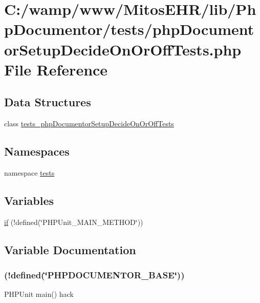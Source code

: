 \hypertarget{php_documentor_setup_decide_on_or_off_tests_8php}{\section{\-C\-:/wamp/www/\-Mitos\-E\-H\-R/lib/\-Php\-Documentor/tests/php\-Documentor\-Setup\-Decide\-On\-Or\-Off\-Tests.php \-File \-Reference}
\label{php_documentor_setup_decide_on_or_off_tests_8php}
}
\subsection*{\-Data \-Structures}
\begin{DoxyCompactItemize}
\item 
class \hyperlink{classtests__php_documentor_setup_decide_on_or_off_tests}{tests\-\_\-php\-Documentor\-Setup\-Decide\-On\-Or\-Off\-Tests}
\end{DoxyCompactItemize}
\subsection*{\-Namespaces}
\begin{DoxyCompactItemize}
\item 
namespace \hyperlink{namespacetests}{tests}
\end{DoxyCompactItemize}
\subsection*{\-Variables}
\begin{DoxyCompactItemize}
\item 
\hyperlink{php_documentor_setup_decide_on_or_off_tests_8php_ae3cacee49c3c7d622bb92397daeb7733}{if} (!defined(\char`\"{}\-P\-H\-P\-Unit\-\_\-\-M\-A\-I\-N\-\_\-\-M\-E\-T\-H\-O\-D\char`\"{}))
\end{DoxyCompactItemize}


\subsection{\-Variable \-Documentation}
\hypertarget{php_documentor_setup_decide_on_or_off_tests_8php_ae3cacee49c3c7d622bb92397daeb7733}{
\subsubsection[{if}]{(!defined(\char`\"{}\-P\-H\-P\-D\-O\-C\-U\-M\-E\-N\-T\-O\-R\-\_\-\-B\-A\-S\-E\char`\"{}))}}\label{php_documentor_setup_decide_on_or_off_tests_8php_ae3cacee49c3c7d622bb92397daeb7733}
\-P\-H\-P\-Unit main() hack

